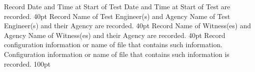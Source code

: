 
%
\tpStep%
{Record Date and Time at Start of Test}
{Date and Time at Start of Test are recorded.}
{40pt}
%
\tpStep%
{Record Name of Test Engineer(s) and Agency}
{Name of Test Engineer(s) and their Agency are recorded.}
{40pt}
%
\tpStep%
{Record Name of Witness(es) and Agency}
{Name of Witness(es) and their Agency are recorded.}
{40pt}
%
\tpStep%
{Record configuration information or name of file that contains such information.}
{Configuration information or name of file that contains such information is recorded.}
{100pt}
%
